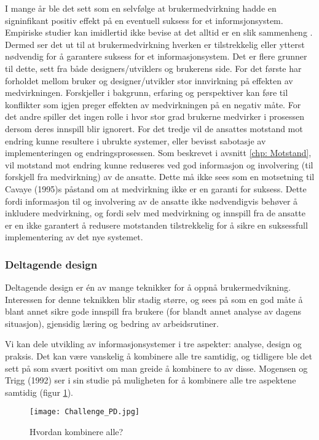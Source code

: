 \noindent
I mange år ble det sett som en selvfølge at brukermedvirkning hadde en signinfikant positiv effekt på en eventuell suksess for et informsjonsystem. Empiriske studier kan imidlertid ikke bevise at det alltid er en slik sammenheng \cite{Cavaye95}. Dermed ser det ut til at brukermedvirkning hverken er tilstrekkelig eller ytterst nødvendig for å garantere suksess for et informasjonsystem. 
Det er flere grunner til dette, sett fra både designers/utviklers og brukerens side. For det første har forholdet mellom bruker og designer/utvikler stor innvirkning på effekten av medvirkningen. Forskjeller i bakgrunn, erfaring og perspektiver kan føre til konflikter som igjen preger effekten av medvirkningen på en negativ måte. For det andre spiller det ingen rolle i hvor stor grad brukerne medvirker i prosessen dersom deres innspill blir ignorert. For det tredje vil de ansattes motstand mot endring kunne resultere i ubrukte systemer, eller bevisst sabotasje av implementeringen og endringsprosessen. Som beskrevet i avsnitt \ref{chp: Motstand}, vil motstand mot endring kunne reduseres ved god informasjon og involvering (til forskjell fra medvirkning) av de ansatte. Dette må ikke sees som en motsetning til Cavaye (1995)s påstand om at medvirkning ikke er en garanti for suksess. Dette fordi informasjon til og involvering av de ansatte ikke nødvendigvis behøver å inkludere medvirkning, og fordi selv med medvirkning og innspill fra de ansatte er en ikke garantert å redusere motstanden tilstrekkelig for å sikre en suksessfull implementering av det nye systemet. \cite{Cavaye95}

\subsubsection{Deltagende design}
\label{dd}
Deltagende design er én av mange teknikker for å oppnå brukermedvikning.
Interessen for denne teknikken blir stadig større, og sees på som en god måte å blant annet sikre gode innspill fra brukere (for blandt annet analyse av dagens situasjon), gjensidig læring og bedring av arbeidsrutiner.

\noindent
Vi kan dele utvikling av informasjonsystemer i tre aspekter: analyse, design og praksis. Det kan være vanskelig å kombinere alle tre samtidig, og tidligere ble det sett på som svært positivt om man greide å kombinere to av disse. Mogensen og Trigg (1992) ser i sin studie på muligheten for å kombinere alle tre aspektene samtidig (figur \ref{Challenge_PD}).

\begin{figure}[H]
\centering
\texttt{[image: Challenge\_PD.jpg]}
\caption{Hvordan kombinere alle?}
\label{Challenge_PD}
\end{figure}

